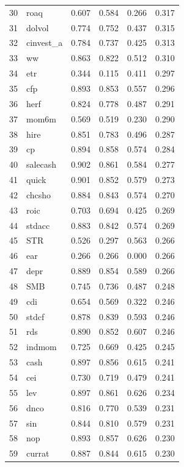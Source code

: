 \begin{footnotesize}
\begin{longtable}{rl|c|c|c|c}
		30 & roaq & 0.607 & 0.584 & 0.266 & 0.317 \\ 
		31 & dolvol & 0.774 & 0.752 & 0.437 & 0.315 \\ 
		32 & cinvest\_a & 0.784 & 0.737 & 0.425 & 0.313 \\ 
		33 & ww & 0.863 & 0.822 & 0.512 & 0.310 \\ 
		34 & etr & 0.344 & 0.115 & 0.411 & 0.297 \\ 
		35 & cfp & 0.893 & 0.853 & 0.557 & 0.296 \\ 
		36 & herf & 0.824 & 0.778 & 0.487 & 0.291 \\ 
		37 & mom6m & 0.569 & 0.519 & 0.230 & 0.290 \\ 
		38 & hire & 0.851 & 0.783 & 0.496 & 0.287 \\ 
		39 & cp & 0.894 & 0.858 & 0.574 & 0.284 \\ 
		40 & salecash & 0.902 & 0.861 & 0.584 & 0.277 \\ 
		41 & quick & 0.901 & 0.852 & 0.579 & 0.273 \\ 
		42 & chcsho & 0.884 & 0.843 & 0.574 & 0.270 \\ 
		43 & roic & 0.703 & 0.694 & 0.425 & 0.269 \\ 
		44 & stdacc & 0.883 & 0.842 & 0.574 & 0.269 \\ 
		45 & STR & 0.526 & 0.297 & 0.563 & 0.266 \\ 
		46 & ear & 0.266 & 0.266 & 0.000 & 0.266 \\ 
		47 & depr & 0.889 & 0.854 & 0.589 & 0.266 \\ 
		48 & SMB & 0.745 & 0.736 & 0.487 & 0.248 \\ 
		49 & cdi & 0.654 & 0.569 & 0.322 & 0.246 \\ 
		50 & stdcf & 0.878 & 0.839 & 0.593 & 0.246 \\ 
		51 & rds & 0.890 & 0.852 & 0.607 & 0.246 \\ 
		52 & indmom & 0.725 & 0.669 & 0.425 & 0.245 \\ 
		53 & cash & 0.897 & 0.856 & 0.615 & 0.241 \\ 
		54 & cei & 0.730 & 0.719 & 0.479 & 0.241 \\ 
		55 & lev & 0.897 & 0.861 & 0.626 & 0.234 \\ 
		56 & dnco & 0.816 & 0.770 & 0.539 & 0.231 \\ 
		57 & sin & 0.844 & 0.810 & 0.579 & 0.231 \\ 
		58 & nop & 0.893 & 0.857 & 0.626 & 0.230 \\ 
		59 & currat & 0.887 & 0.844 & 0.615 & 0.230 \\ 

\end{longtable}
\end{footnotesize}
